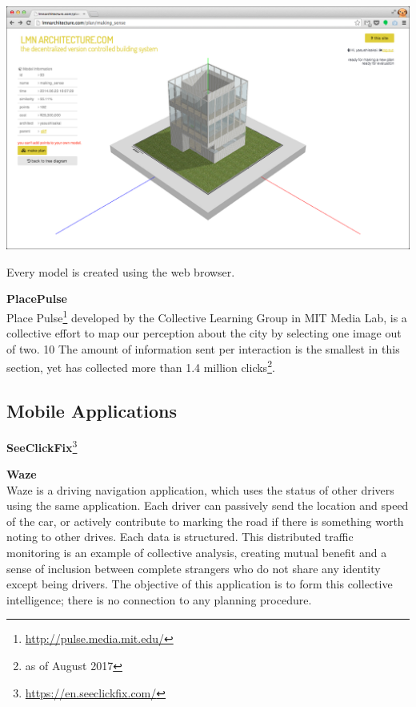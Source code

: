 \begin{marginfigure}[{0cm}]
  \includegraphics[width=\textwidth]{chapters/3/fig/lmn_006.png}               
  \caption[LMN: modeling inside the browser]{Every model is created using the web browser.}
  \label{fig:lnm_create}
\end{marginfigure}

\textbf{PlacePulse}\\
Place Pulse\footnote{\url{http://pulse.media.mit.edu/}}\cite{salesses2013collaborative} developed by the Collective Learning Group in MIT Media Lab, is a collective effort to map our perception about the city by selecting one image out of two. 10 The amount of information sent per interaction is the smallest in this section, yet has collected more than 1.4 million clicks\footnote{as of August 2017}.

\subsection{Mobile Applications}

\textbf{SeeClickFix}\footnote{\url{https://en.seeclickfix.com/}}\\

\textbf{Waze}\\
Waze is a driving navigation application, which uses the status of other drivers using the same application. Each driver can passively send the location and speed of the car, or actively contribute to marking the road if there is something worth noting to other drives. Each data is structured. This distributed traffic monitoring is an example of collective analysis, creating mutual benefit and a sense of inclusion between complete strangers who do not share any identity except being drivers. The objective of this application is to form this collective intelligence; there is no connection to any planning procedure.

